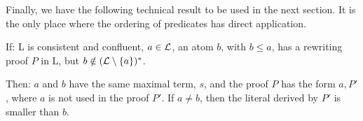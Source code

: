 %
%
%
Finally, we have the following technical result to be 
used in the next section. It is the only place where the ordering of predicates
has direct application.
 \begin{LEMMA} \label {le:first-rule} 
If: \C L is consistent and confluent, \(a\in \mbox {$\cal L$}\), an atom $b$, with \(b\leq a\), has a
rewriting proof $P$ in \C L, but \(b\notin(\mbox {$\cal L$}\setminus \{a\})^\ast\). 

 Then:
$a$ and $b$ have the same maximal term, $s$, and the proof $P$ has the
form $a,P'$, where $a$ is not used in the proof $P'$. If \(a\ne b\), then the
literal derived by $P'$ is smaller than $b$.
 \end{LEMMA}
%
